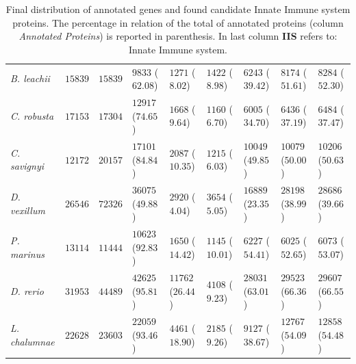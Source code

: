 \documentclass[11pt]{article}
\begin{document}
\begin{table}
\begin{tabular}{p{3.2cm}p{2cm}p{2cm}p{2cm}p{2cm}p{2cm}p{2.1cm}p{2.7cm}p{2.6cm}}
\textsl{B. leachii }&$15839$&$15839$&$9833$ ($62.08$)&$1271$ ($8.02$)&$1422$ ($8.98$)&$6243$ ($39.42$)&$8174$ ($51.61$)&$8284$ ($52.30$)\\
\textsl{C. robusta}&$17153$&$17304$&$12917$ ($74.65$)&$1668$ ($9.64$)&$1160$ ($6.70$)&$6005$ ($34.70$)&$6436$ ($37.19$)&$6484$ ($37.47$)\\
\textsl{C. savignyi}&$12172$&$20157$&$17101$ ($84.84$)&$2087$ ($10.35$)&$1215$ ($6.03$)&$10049$ ($49.85$)&$10079$ ($50.00$)&$10206$ ($50.63$)\\
\textsl{D. vexillum}&$26546$&$72326$&$36075$ ($49.88$)&$2920$ ($4.04$)&$3654$ ($5.05$)&$16889$ ($23.35$)&$28198$ ($38.99$)&$28686$ ($39.66$)\\
\midrule
\textsl{P. marinus}&$13114$&$11444$&$10623$ ($92.83$)&$1650$ ($14.42$)&$1145$ ($10.01$)&$6227$ ($54.41$)&$6025$ ($52.65$)&$6073$ ($53.07$)\\
\textsl{D. rerio}&$31953$&$44489$&$42625$ ($95.81$)&$11762$ ($26.44$)&$4108$ ($9.23$)&$28031$ ($63.01$)&$29523$ ($66.36$)&$29607$ ($66.55$)\\
\textsl{L. chalumnae}&$22628$&$23603$&$22059$ ($93.46$)&$4461$ ($18.90$)&$2185$ ($9.26$)&$9127$ ($38.67$)&$12767$ ($54.09$)&$12858$ ($54.48$)\\
\bottomrule
\end{tabular}
\caption{Final distribution of annotated genes and found candidate Innate
Immune system proteins. The percentage in relation of the total of annotated
proteins (column \textit{Annotated Proteins}) is reported in parenthesis. In
last column \textbf{IIS} refers to: Innate Immune system.}\label{table:distribution_prot}
\end{table}
\end{document}

